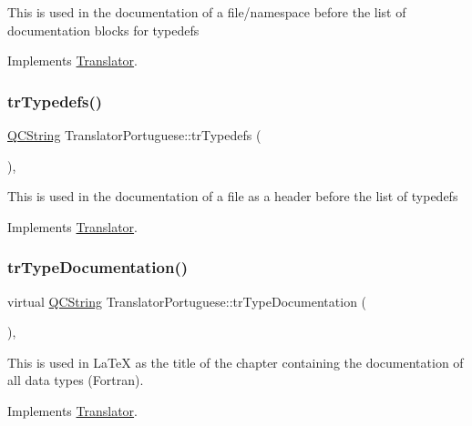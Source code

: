This is used in the documentation of a file/namespace before the list of documentation blocks for typedefs 

Implements \mbox{\hyperlink{class_translator}{Translator}}.

\mbox{\label{class_translator_portuguese_ac580870c36dc2e0d8fc026dd718b08ff}} 
\subsubsection{\texorpdfstring{trTypedefs()}{trTypedefs()}}
{\footnotesize\ttfamily \mbox{\hyperlink{class_q_c_string}{Q\+C\+String}} Translator\+Portuguese\+::tr\+Typedefs (\begin{DoxyParamCaption}{ }\end{DoxyParamCaption})\hspace{0.3cm}{\ttfamily [inline]}, {\ttfamily [virtual]}}

This is used in the documentation of a file as a header before the list of typedefs 

Implements \mbox{\hyperlink{class_translator}{Translator}}.

\mbox{\label{class_translator_portuguese_ab8c351e04f153f0176618fba500a325c}} 
\subsubsection{\texorpdfstring{trTypeDocumentation()}{trTypeDocumentation()}}
{\footnotesize\ttfamily virtual \mbox{\hyperlink{class_q_c_string}{Q\+C\+String}} Translator\+Portuguese\+::tr\+Type\+Documentation (\begin{DoxyParamCaption}{ }\end{DoxyParamCaption})\hspace{0.3cm}{\ttfamily [inline]}, {\ttfamily [virtual]}}

This is used in La\+TeX as the title of the chapter containing the documentation of all data types (Fortran). 

Implements \mbox{\hyperlink{class_translator}{Translator}}.

